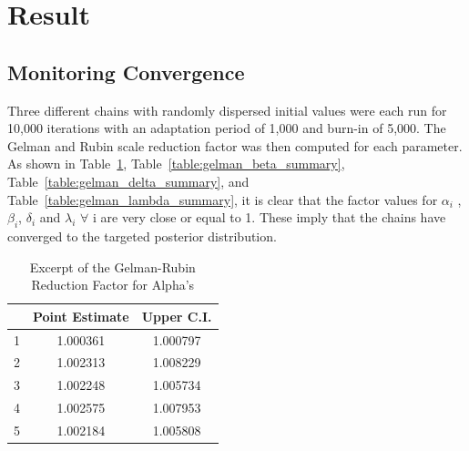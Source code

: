 \documentclass[twoside,onecolumn]{article}
\begin{document}

\section{Result}

\subsection{Monitoring Convergence}
Three different chains with randomly dispersed initial values were each run for 10,000 iterations with an adaptation period of 1,000 and burn-in of 5,000. The Gelman and Rubin scale reduction factor was then computed for each parameter. As shown in Table~\ref{table:gelman_alpha_summary}, Table~\ref{table:gelman_beta_summary}, Table~\ref{table:gelman_delta_summary}, and Table~\ref{table:gelman_lambda_summary}, it is clear that the factor values for $\alpha_i$ , $\beta_i$, $\delta_i$ and $\lambda_i$ $\forall$ i are very close or equal to 1. These imply that the chains have converged to the targeted posterior distribution. 

\begin{table}[ht]
\caption{Excerpt of the Gelman-Rubin Reduction Factor for Alpha's} %
\centering %
\begin{tabular}{c c c} %
\hline\hline %
 & Point Estimate & Upper C.I. \\ [1ex] %
\hline %
1 & 1.000361 & 1.000797 \\ %
2 & 1.002313 & 1.008229 \\ 
3 & 1.002248 & 1.005734 \\
4 & 1.002575 & 1.007953 \\
5 & 1.002184 & 1.005808 \\ [1ex] %
\hline %
\end{tabular}
\label{table:gelman_alpha_summary} %
\end{table}
\end{document}
